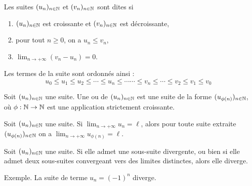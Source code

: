 \documentclass[10pt,class=article,crop=false]{standalone}
\begin{document}
\begin{multicols}{2}
\begin{definition}
	Les suites $(u_n)_{n\in \mathbb{N}}$ et $(v_n)_{n\in \mathbb{N}}$ sont dites  si
	\begin{enumerate}
		\item $(u_n)_{n\in \mathbb{N}}$ est croissante et $(v_n)_{n\in \mathbb{N}}$ est décroissante,
		\item pour tout $n\geq 0$, on a $u_n\leq v_n$,
		\item $\lim_{n\to +\infty} (v_n -u_n) = 0$.
	\end{enumerate}
\end{definition}

\begin{theoreme}
	\sauteligne
\end{theoreme}

Les termes de la suite sont ordonnés ainsi :
$$u_0 \le u_1 \le u_2 \le \cdots \le u_n \le \cdots \cdots \le v_n\le \cdots \le v_2 \le v_1 \le v_0$$



\begin{definition}
	Soit $(u_n)_{n\in \mathbb{N}}$ une suite. Une  ou
	 de  $(u_n)_{n\in \mathbb{N}}$ est une suite de la forme
	$(u_{\phi(n)})_{n\in \mathbb{N}}$, où $\phi : \mathbb{N} \to \mathbb{N}$ est une application strictement croissante.
\end{definition}


\begin{proposition}
	Soit $(u_n)_{n\in \mathbb{N}}$ une suite. Si $\lim_{n\to +\infty}u_n=\ell$, alors
	pour toute suite extraite $(u_{\phi(n)})_{n\in \mathbb{N}}$ on a $\lim_{n\to +\infty} u_{\phi(n)}=\ell$.
\end{proposition}


\begin{corollaire}
	Soit $(u_n)_{n\in \mathbb{N}}$ une suite. Si elle admet une sous-suite divergente,
	ou bien si elle admet deux sous-suites convergeant vers des limites distinctes, alors elle diverge.
\end{corollaire}

Exemple. La suite de terme $u_n=(-1)^n$ diverge.


\end{multicols}
\end{document}

